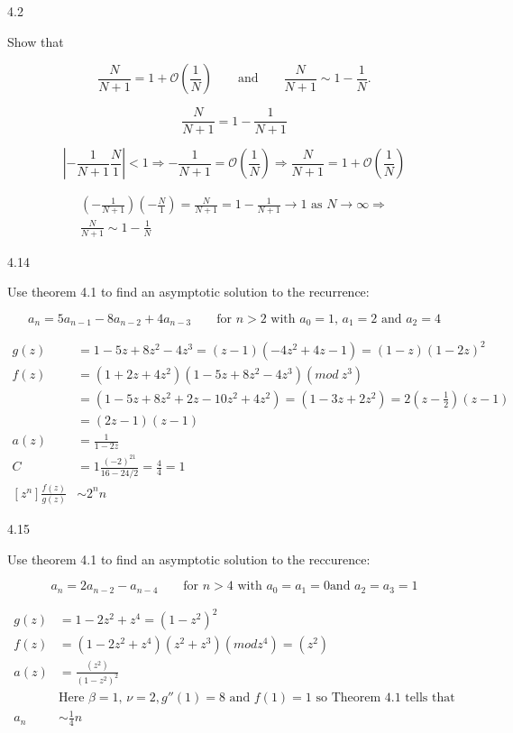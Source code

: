 \documentclass[12pt]{article}
\begin{document}
4.2

Show that

\begin{equation}
\frac{N}{N + 1} = 1 + \mathcal{O}\left(\frac{1}{N}\right) \qquad \text{and}
\qquad \frac{N}{N + 1} \sim 1 - \frac{1}{N}. \nonumber
\end{equation}

\begin{equation}
\frac{N}{N + 1} = 1 - \frac{1}{N + 1} \nonumber
\end{equation}

\begin{equation}
\left|- \frac{1}{N + 1} \frac{N}{1} \right| < 1 \Rightarrow -\frac{1}{N + 1} =
\mathcal{O}\left(\frac{1}{N}\right) \Rightarrow \frac{N}{N + 1} =
1 + \mathcal{O}\left(\frac{1}{N}\right)\nonumber
\end{equation}

\begin{equation}
\begin{split}
\left(-\frac{1}{N + 1}\right)\left(-\frac{N}{1}\right) = \frac{N}{N + 1} =
1 - \frac{1}{N + 1} \rightarrow 1 \text{ as } N \rightarrow \infty \Rightarrow\\
\frac{N}{N + 1} \sim 1 - \frac{1}{N}
\nonumber
\end{split}
\end{equation}

4.14

Use theorem 4.1 to find an asymptotic solution to the recurrence:

\[
a_n = 5a_{n - 1} - 8a_{n - 2} + 4a_{n - 3} \qquad \text{for $n > 2$ with
    $a_0 = 1$, $a_1 = 2$ and $a_2 = 4$} \nonumber
\]

\[
\begin{split}
g(z) & = 1 - 5z + 8z^2 - 4z^3 = (z - 1)(-4z^2 + 4z - 1) = (1 - z)(1 - 2z)^2 \\
f(z) & = (1 + 2z + 4z^2)(1 - 5z + 8z^2 - 4z^3)(mod\ z^3) \\
     & = (1 - 5z + 8z^2 + 2z - 10z^2 + 4z^2) = (1 - 3z + 2z^2)
     = 2(z - \frac{1}{2})(z - 1) \\
     & = (2z - 1)(z - 1) \\
a(z) & = \frac{1}{1 - 2z} \\
C & = 1\frac{(-2)^21}{16 - 24/2} = \frac{4}{4} = 1 \\
[z^n]\frac{f(z)}{g(z)} & \sim 2^nn
\end{split}
\]

4.15

Use theorem 4.1 to find an asymptotic solution to the reccurence:

\[
a_n = 2a_{n - 2} - a_{n - 4} \qquad \text{for $n > 4$ with $a_0 = a_1 = 0$
    and $a_2 = a_3 = 1$}
\]

\[
\begin{split}
g(z) & = 1 - 2z^2 + z^4 = (1 - z^2)^2 \\
f(z) & = (1 - 2z^2 + z^4)(z^2 + z^3)(mod z^4) = (z^2) \\
a(z) & = \frac{(z^2)}{(1 - z^2)^2}\\
& \text{Here $\beta = 1$, $\nu = 2, g''(1) = 8$ and $f(1) = 1$ so Theorem 4.1 tells that} \\
a_n & \sim \frac{1}{4}n
\end{split}
\]
\end{document}

